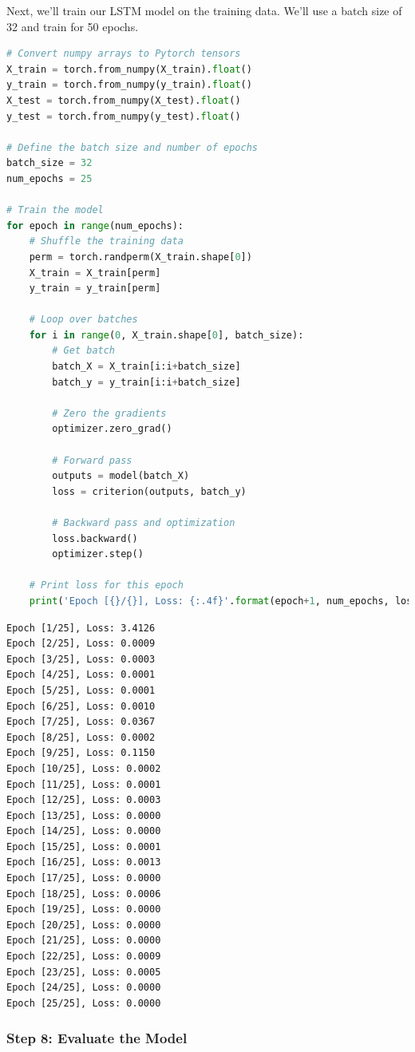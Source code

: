 Next, we'll train our LSTM model on the training data. We'll use a batch
size of 32 and train for 50 epochs.

\begin{lstlisting}[language=Python]
# Convert numpy arrays to Pytorch tensors
X_train = torch.from_numpy(X_train).float()
y_train = torch.from_numpy(y_train).float()
X_test = torch.from_numpy(X_test).float()
y_test = torch.from_numpy(y_test).float()

# Define the batch size and number of epochs
batch_size = 32
num_epochs = 25

# Train the model
for epoch in range(num_epochs):
    # Shuffle the training data
    perm = torch.randperm(X_train.shape[0])
    X_train = X_train[perm]
    y_train = y_train[perm]

    # Loop over batches
    for i in range(0, X_train.shape[0], batch_size):
        # Get batch
        batch_X = X_train[i:i+batch_size]
        batch_y = y_train[i:i+batch_size]

        # Zero the gradients
        optimizer.zero_grad()

        # Forward pass
        outputs = model(batch_X)
        loss = criterion(outputs, batch_y)

        # Backward pass and optimization
        loss.backward()
        optimizer.step()

    # Print loss for this epoch
    print('Epoch [{}/{}], Loss: {:.4f}'.format(epoch+1, num_epochs, loss.item()))
\end{lstlisting}

\begin{lstlisting}
Epoch [1/25], Loss: 3.4126
Epoch [2/25], Loss: 0.0009
Epoch [3/25], Loss: 0.0003
Epoch [4/25], Loss: 0.0001
Epoch [5/25], Loss: 0.0001
Epoch [6/25], Loss: 0.0010
Epoch [7/25], Loss: 0.0367
Epoch [8/25], Loss: 0.0002
Epoch [9/25], Loss: 0.1150
Epoch [10/25], Loss: 0.0002
Epoch [11/25], Loss: 0.0001
Epoch [12/25], Loss: 0.0003
Epoch [13/25], Loss: 0.0000
Epoch [14/25], Loss: 0.0000
Epoch [15/25], Loss: 0.0001
Epoch [16/25], Loss: 0.0013
Epoch [17/25], Loss: 0.0000
Epoch [18/25], Loss: 0.0006
Epoch [19/25], Loss: 0.0000
Epoch [20/25], Loss: 0.0000
Epoch [21/25], Loss: 0.0000
Epoch [22/25], Loss: 0.0009
Epoch [23/25], Loss: 0.0005
Epoch [24/25], Loss: 0.0000
Epoch [25/25], Loss: 0.0000
\end{lstlisting}

\subsubsection{Step 8: Evaluate the
Model}\label{step-8-evaluate-the-model}

